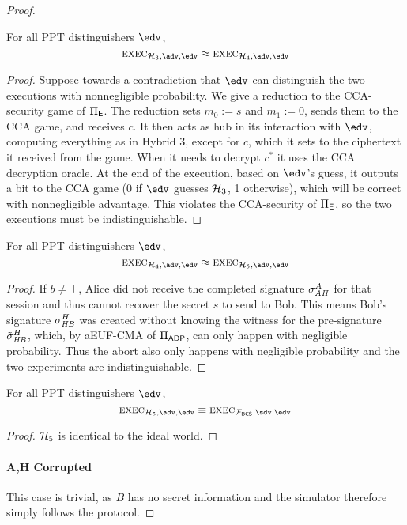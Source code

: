 \begin{proof}
\begin{claim}
For all PPT distinguishers $\env$,
\[
    \exec_{\hybrid_3,\adv,\env} \approx \exec_{\hybrid_4,\adv,\env}
\]
\end{claim}
\begin{proof}
Suppose towards a contradiction that $\env$ can distinguish the two executions with nonnegligible probability. We give a reduction to the CCA-security game of $\Pi_{\mathsf{E}}$. The reduction sets $m_0 := s$ and $m_1 := 0$, sends them to the CCA game, and receives $c$. It then acts as hub in its interaction with $\env$, computing everything as in Hybrid 3, except for $c$, which it sets to the ciphertext it received from the game. When it needs to decrypt $c^*$ it uses the CCA decryption oracle. At the end of the execution, based on $\env$'s guess, it outputs a bit to the CCA game (0 if $\env$ guesses $\mathcal{H}_3$, 1 otherwise), which will be correct with nonnegligible advantage. This violates the CCA-security of $\Pi_{\mathsf{E}}$, so the two executions must be indistinguishable. 
\end{proof}

\begin{claim}
For all PPT distinguishers $\env$,
\[
    \exec_{\hybrid_4,\adv,\env} \approx \exec_{\hybrid_5,\adv,\env}
\]
\end{claim}
\begin{proof}
If $b \neq \top$, Alice did not receive the completed signature $\sigma_{\mathit{AH}}^A$ for that session and thus cannot recover the secret $s$ to send to Bob. This means Bob's signature $\sigma_{\mathit{HB}}^H$ was created without knowing the witness for the pre-signature $\tilde{\sigma}_{\mathit{HB}}^H$, which, by aEUF-CMA of $\Pi_{\mathsf{ADP}}$, can only happen with negligible probability. Thus the abort also only happens with negligible probability and the two experiments are indistinguishable.
\end{proof}

\begin{claim}
For all PPT distinguishers $\env$,
\[
    \exec_{\hybrid_5,\adv,\env} \equiv \exec_{\flocks,\Sim,\env}
\]
\end{claim}
\begin{proof}
    $\mathcal{H}_5$ is identical to the ideal world.
\end{proof}

\paragraph{A,H Corrupted} This case is trivial, as $B$ has no secret information and the simulator therefore simply follows the protocol.


\end{proof}
